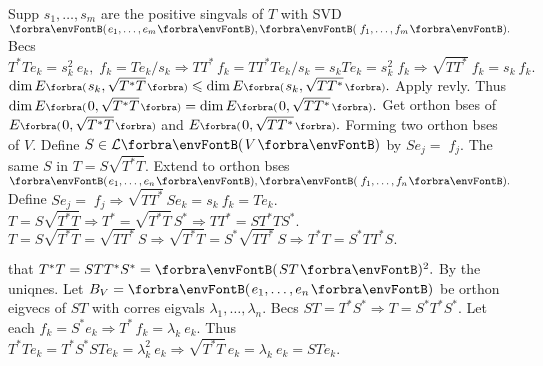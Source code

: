 
Supp $s_1,\dots,s_m$ are the positive singvals of $T$ with SVD $\Par{e_1,\dots,e_m},\Par{\,f_1,\dots,f_m}.$\vspace{1pt}\parSol{}
Becs $T^*Te_k=s_k^2\:\!e_k,\;f_k=Te_k\big/s_k\Rightarrow TT^*\,f_k=TT^*Te_k\big/s_k=s_kTe_k=s_k^2\;f_k\Rightarrow\sqrt{TT^*}\:f_k=s_k\:f_k.$\vspace{1pt}\parSol{}
$\dim E\BigPar{s_k,\sqrt{T^*T}}\leqslant\dim E\BigPar{s_k,\sqrt{TT^*}}.$ Apply revly. Thus $\dim E\BigPar{0,\sqrt{T^*T}}=\dim E\BigPar{0,\sqrt{TT^*}}.$\vspace{1pt}\parSol{}
Get orthon bses of $E\BigPar{0,\sqrt{T^*T}}$ and $E\BigPar{0,\sqrt{TT^*}}.$ Forming two orthon bses of $V.$\parSol{}
Define $S\in\Lm{V}$ by $Se_j=\;\!f_j.$ \quad\ANote The same $S$ in $T=S\sqrt{T^*T}.$\PfEnd\vspace{2pt}\parSol{}
\Or Extend to orthon bses $\Par{e_1,\dots,e_n},\Par{\,f_1,\dots,f_n}.$ Define $Se_j=\;\!f_j\Rightarrow\sqrt{TT^*}\,Se_k=s_k\:f_k=Te_k.$\PfEnd\vspace{4pt}
\ACoro $T=S\sqrt{T^*T}\Rightarrow T^*=\sqrt{T^*T}\,S^*\Longrightarrow TT^*=ST^*TS^*.$\parCor
\Or $T=S\sqrt{T^*T}=\sqrt{TT^*}\,S\Rightarrow \sqrt{T^*T}=S^*\sqrt{TT^*}\,S\Longrightarrow T^*T=S^*TT^*S.$
\SepLine

\NOTICE that $T^*T=STT^*S^*=\Par{ST}{^2}.$ \;By the uniqnes.
\PfEnd\vspace{2pt}\parSol{}
\Or Let $B_V=\Par{e_1,\dots,e_n}$ be orthon eigvecs of $ST$ with corres eigvals $\lambda_1,\dots,\lambda_n.$\parSol{}
Becs $ST=T^*S^*\Rightarrow T=S^*T^*S^*.$ \;Let each \:$f_k=S^*e_k\Rightarrow T^*\,f_k=\lambda_k\:\!e_k.$\parSol{}
Thus $T^*Te_k=T^*S^*STe_k=\lambda_k^2\:\!e_k\Rightarrow\sqrt{T^*T}\,e_k=\lambda_k\:\!e_k=STe_k.$\PfEnd
\SepLine

